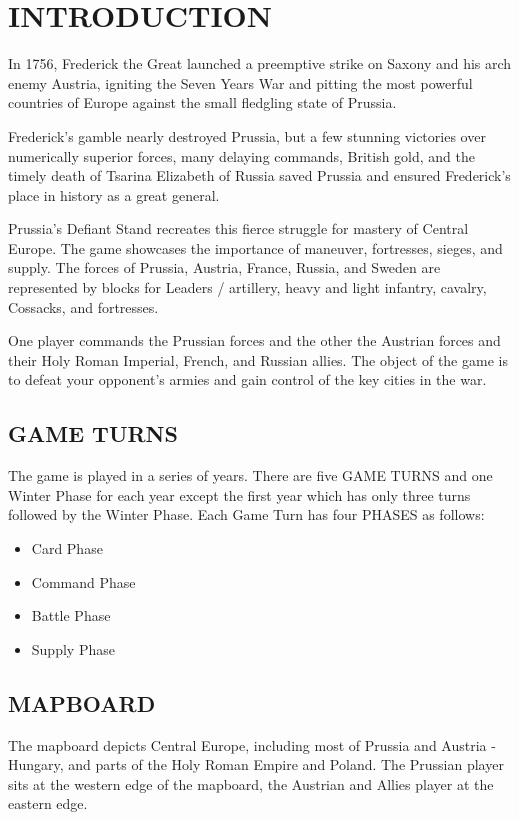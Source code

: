 \section{INTRODUCTION}

In 1756, Frederick the Great launched a preemptive strike on Saxony and his arch enemy Austria, igniting the Seven Years War and pitting the most powerful countries of Europe against the small fledgling state of Prussia.

Frederick’s gamble nearly destroyed Prussia, but a few stunning victories over numerically superior forces, many delaying commands, British gold, and the timely death of Tsarina Elizabeth of Russia saved Prussia and ensured Frederick’s place in history as a great general.

Prussia’s Defiant Stand recreates this fierce struggle for mastery of Central Europe. The game showcases the importance of maneuver, fortresses, sieges, and supply. The forces of Prussia, Austria, France, Russia, and Sweden are represented by blocks for Leaders / artillery, heavy and light infantry, cavalry, Cossacks, and fortresses.

One player commands the Prussian forces and the other the Austrian forces and their Holy Roman Imperial, French, and Russian allies. The object of the game is to defeat your opponent’s armies and gain control of the key cities in the war.

\subsection{GAME TURNS}

The game is played in a series of years. There are five GAME TURNS and one Winter Phase for each year except the
first year which has only three turns followed by the Winter
Phase. Each Game Turn has four PHASES as follows:

\begin{itemize}
  \setlength\itemsep{-1em}
  \item Card Phase
  \item Command Phase
  \item Battle Phase
  \item Supply Phase
\end{itemize}

\subsection{MAPBOARD}

The mapboard depicts Central Europe, including most of Prussia and Austria - Hungary, and parts of the Holy Roman Empire and Poland. The Prussian player sits at the western edge of the mapboard, the Austrian and Allies player at the eastern edge.

